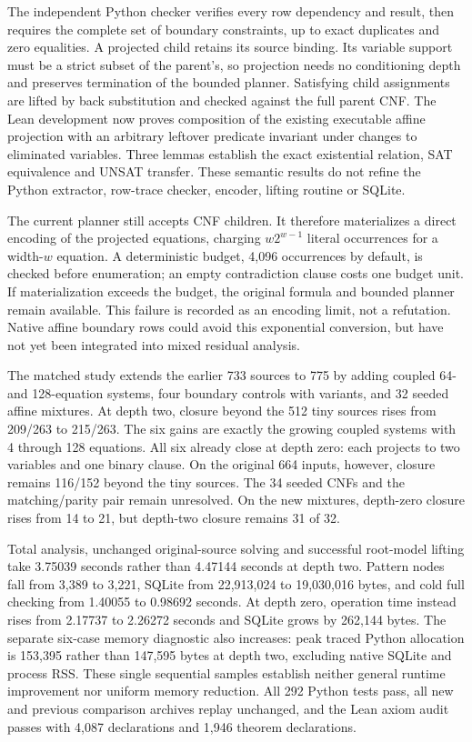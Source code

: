 \documentclass[11pt,a4paper]{article}
\numberwithin{equation}{section}
\theoremstyle{plain}
\theoremstyle{definition}
\theoremstyle{remark}
\begin{document}
The independent Python checker verifies every row dependency and result, then requires the complete set of boundary constraints, up to exact duplicates and zero equalities. A projected child retains its source binding. Its variable support must be a strict subset of the parent's, so projection needs no conditioning depth and preserves termination of the bounded planner. Satisfying child assignments are lifted by back substitution and checked against the full parent CNF. The Lean development now proves composition of the existing executable affine projection with an arbitrary leftover predicate invariant under changes to eliminated variables. Three lemmas establish the exact existential relation, SAT equivalence and UNSAT transfer. These semantic results do not refine the Python extractor, row-trace checker, encoder, lifting routine or SQLite.

The current planner still accepts CNF children. It therefore materializes a direct encoding of the projected equations, charging $w2^{w-1}$ literal occurrences for a width-$w$ equation. A deterministic budget, 4,096 occurrences by default, is checked before enumeration; an empty contradiction clause costs one budget unit. If materialization exceeds the budget, the original formula and bounded planner remain available. This failure is recorded as an encoding limit, not a refutation. Native affine boundary rows could avoid this exponential conversion, but have not yet been integrated into mixed residual analysis.

The matched study extends the earlier 733 sources to 775 by adding coupled 64- and 128-equation systems, four boundary controls with variants, and 32 seeded affine mixtures. At depth two, closure beyond the 512 tiny sources rises from 209/263 to 215/263. The six gains are exactly the growing coupled systems with 4 through 128 equations. All six already close at depth zero: each projects to two variables and one binary clause. On the original 664 inputs, however, closure remains 116/152 beyond the tiny sources. The 34 seeded CNFs and the matching/parity pair remain unresolved. On the new mixtures, depth-zero closure rises from 14 to 21, but depth-two closure remains 31 of 32.

Total analysis, unchanged original-source solving and successful root-model lifting take 3.75039 seconds rather than 4.47144 seconds at depth two. Pattern nodes fall from 3,389 to 3,221, SQLite from 22,913,024 to 19,030,016 bytes, and cold full checking from 1.40055 to 0.98692 seconds. At depth zero, operation time instead rises from 2.17737 to 2.26272 seconds and SQLite grows by 262,144 bytes. The separate six-case memory diagnostic also increases: peak traced Python allocation is 153,395 rather than 147,595 bytes at depth two, excluding native SQLite and process RSS. These single sequential samples establish neither general runtime improvement nor uniform memory reduction. All 292 Python tests pass, all new and previous comparison archives replay unchanged, and the Lean axiom audit passes with 4,087 declarations and 1,946 theorem declarations.
\end{document}
